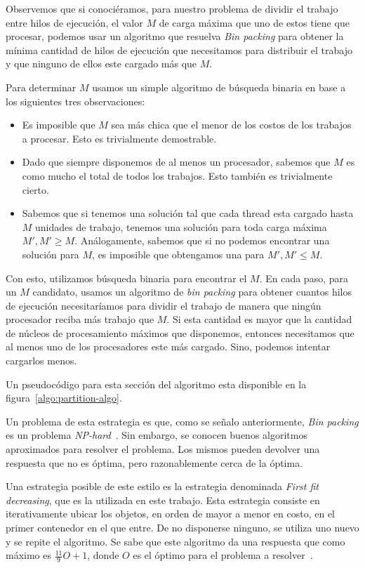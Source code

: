Observemos que si conoci\'eramos, para nuestro problema de dividir el trabajo entre
hilos de ejecuci\'on, el valor $M$ de carga m\'axima que uno de estos tiene que
procesar, podemos usar un algoritmo que resuelva \textit{Bin packing} para
obtener la m\'inima cantidad de hilos de ejecuci\'on que necesitamos para distribuir
el trabajo y que ninguno de ellos este cargado m\'as que $M$.

Para determinar $M$ usamos un simple algoritmo de b\'usqueda binaria en base a los
siguientes tres observaciones:

\begin{itemize}
    \item Es imposible que $M$ sea m\'as chica que el menor de los costos de los
    trabajos a procesar. Esto es trivialmente demostrable.
    \item Dado que siempre disponemos de al menos un procesador, sabemos que $M$
    es como mucho el total de todos los trabajos. Esto tambi\'en es trivialmente
    cierto.
    \item Sabemos que si tenemos una soluci\'on tal que cada thread esta cargado
    hasta $M$ unidades de trabajo, tenemos una soluci\'on para toda carga m\'axima
    $M', M' \geq M$. An\'alogamente, sabemos que si no podemos encontrar una
    soluci\'on para $M$, es imposible que obtengamos una para $M', M' \leq M$.
\end{itemize}

Con esto, utilizamos b\'usqueda binaria para encontrar el $M$. En cada paso, para
un $M$ candidato, usamos un algoritmo de \textit{bin packing} para obtener
cuantos hilos de ejecuci\'on necesitar\'iamos para dividir el trabajo de manera que
ning\'un procesador reciba m\'as trabajo que $M$. Si esta cantidad es mayor que
la cantidad de n\'ucleos de procesamiento m\'aximos que disponemos, entonces
necesitamos que al menos uno de los procesadores este m\'as cargado. Sino, podemos
intentar cargarlos menos.

Un pseudoc\'odigo para esta secci\'on del algoritmo esta disponible en la figura~\ref{algo:partition-algo}.

Un problema de esta estrategia es que, como se se\~nalo anteriormente,
\textit{Bin packing} es un problema \textit{NP-hard}~\cite{NPCompleteness}. Sin
embargo, se conocen buenos algoritmos aproximados para resolver el problema. Los
mismos pueden devolver una respuesta que no es \'optima, pero razonablemente cerca
de la \'optima.

Una estrategia posible de este estilo es la estrategia denominada \textit{First
fit decreasing}, que es la utilizada en este trabajo. Esta estrategia consiste en
iterativamente ubicar los objetos, en orden de mayor a menor en costo,
en el primer contenedor en el que entre. De no disponerse ninguno, se utiliza
uno nuevo y se repite el algoritmo. Se sabe que este algoritmo da una respuesta
que como m\'aximo es $\frac{11}{9} O + 1$, donde $O$ es el \'optimo para el
problema a resolver~\cite{FFDDemo}.

